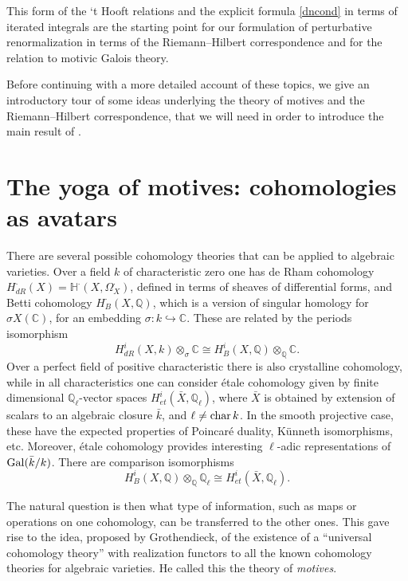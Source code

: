\documentclass[10pt]{amsart}
\def\C{{\mathbb C}}
\renewcommand{\H}{\mathbb{H}}
\def\Q{{\mathbb Q}}
\def\Gal{{\rm Gal}}
\numberwithin{equation}{section}
\begin{document}
\smallskip

This form of the `t Hooft relations and the explicit formula
\eqref{dncond} in terms
of iterated integrals are the starting point for our formulation of
perturbative renormalization in terms of the Riemann--Hilbert
correspondence and for the relation to motivic Galois theory.

\smallskip

Before
continuing with a more detailed account of these topics, we give an
introductory tour of some ideas underlying the
theory of motives and the Riemann--Hilbert correspondence, that we
will need in order to introduce the main result of \cite{cmln}.

\section{The yoga of motives: cohomologies as avatars}\label{MotSect}

There are several possible cohomology theories that can be applied to
algebraic varieties. Over a field $k$ of characteristic zero one has
de Rham cohomology $H_{dR}^\cdot(X)=\H^\cdot(X,\Omega_X^\cdot)$, defined
in terms of sheaves of differential forms, and Betti cohomology
$H^\cdot_B(X,\Q)$, which is a version of singular homology for $\sigma
X(\C)$, for an embedding $\sigma: k\hookrightarrow \C$. These are
related by the periods isomorphism
$$ H^i_{dR}(X,k)\otimes_\sigma \C \cong H^i_B (X,\Q)\otimes_\Q \C. $$
Over a perfect field of positive characteristic there is also crystalline
cohomology, while in all characteristics one can consider \'etale
cohomology given by finite dimensional $\Q_\ell$-vector spaces
$H^i_{et}(\bar X, \Q_\ell)$, where $\bar X$ is obtained by
extension of scalars to an algebraic closure $\bar k$, and $\ell\neq
{\rm char}\, k$. In the smooth projective case, these have the
expected properties of Poincar\'e duality, K\"unneth isomorphisms,
etc. Moreover, \'etale cohomology provides interesting $\ell$-adic
representations of $\Gal(\bar k/k)$. There are comparison
isomorphisms
$$ H^i_B(X,\Q)\otimes_\Q \Q_\ell \cong H^i_{et} (\bar X,\Q_\ell). $$

\smallskip

The natural question is then what type of information, such as
maps or operations on one cohomology, can be transferred to the other
ones. This gave rise to the idea, proposed by Grothendieck, of the
existence of a ``universal cohomology theory'' with realization
functors to all the known cohomology theories for algebraic
varieties. He called this the theory of {\em motives}.
\end{document}

